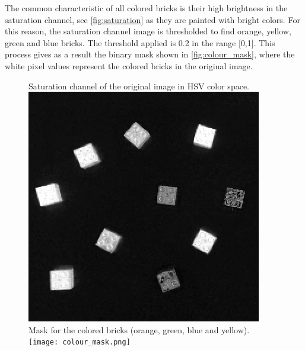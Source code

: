 The common characteristic of all colored bricks is their high brightness in the saturation channel, see \autoref{fig:saturation} as they are painted with bright colors. For this reason, the saturation channel image is thresholded to find orange, yellow, green and blue bricks. The threshold applied is 0.2 in the range [0,1]. This process gives as a result the binary mask shown in \autoref{fig:colour_mask}, where the white pixel values represent the colored bricks in the original image.

\begin{figure}[H]
	\captionbox  %
	{ 
		Saturation channel of the original image in HSV color space.              
		\label{fig:saturation}                                  
	}                                                                 
	{                                                                  
		\includegraphics[width=.25\textwidth]{figures/saturation.png}         
	}                                                                    
	\hspace{5pt}                                                          
	\captionbox
	{      
		Mask for the colored bricks (orange, green, blue and yellow). 
		\label{fig:colour_mask}                                     
	}
	{
		\texttt{[image: colour\_mask.png]}            
	}                                                                             
\end{figure}


